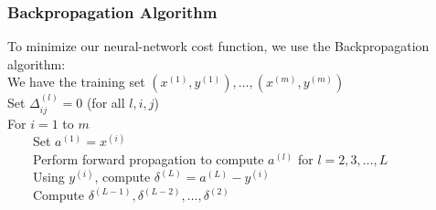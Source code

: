 \documentclass{article}
\begin{document}
\subsubsection{Backpropagation Algorithm}
To minimize our neural-network cost function, we use the Backpropagation algorithm:\\
We have the training set ${(x^{(1)},y^{(1)}),\ldots,(x^{(m)},y^{(m)})}$\\
Set $\Delta_{ij}^{(l)} = 0$ (for all $l,i,j$)\\
For $i = 1$ to $m$\\
$\qquad$Set $a^{(1)} = x^{(i)}$\\
$\qquad$Perform forward propagation to compute $a^{(l)}$ for $l = 2,3,\ldots,L$\\
$\qquad$Using $y^{(i)}$, compute $\delta^{(L)} = a^{(L)} - y^{(i)}$\\
$\qquad$Compute $\delta^{(L-1)},\delta^{(L-2)},\ldots,\delta^{(2)}$\\
\end{document}
